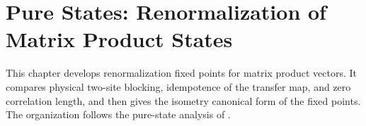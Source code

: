 
\chapter{Pure States: Renormalization of Matrix Product States}\label{ch:mps_rfp}

This chapter develops renormalization fixed points for matrix product vectors.
It compares physical two-site blocking, idempotence of the transfer map, and
zero correlation length, and then gives the isometry canonical form of the
fixed points.  The organization follows the pure-state analysis of
\cite[Section~3]{Cirac2016MPDO_arXiv}.



